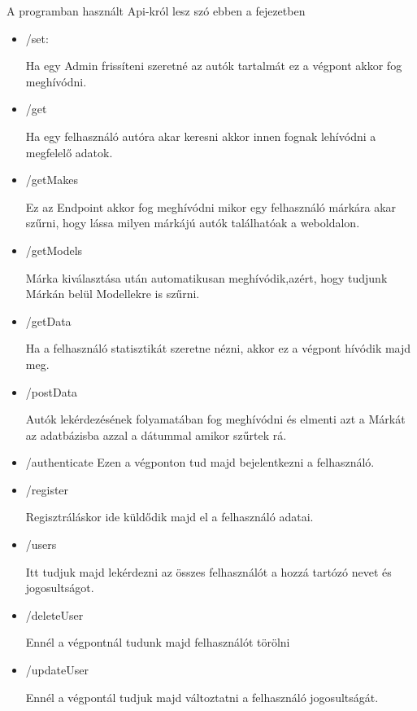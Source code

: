 A programban használt Api-król lesz szó ebben a fejezetben
\begin{itemize}
\item /set:

Ha egy Admin frissíteni szeretné az autók tartalmát ez a végpont akkor fog meghívódni.
\item /get

Ha egy felhasználó autóra akar keresni akkor innen fognak lehívódni a megfelelő adatok.
\item /getMakes

Ez az Endpoint akkor fog meghívódni mikor egy felhasználó márkára akar szűrni, hogy lássa milyen márkájú autók találhatóak a weboldalon.
\item /getModels

Márka kiválasztása után automatikusan meghívódik,azért, hogy tudjunk Márkán belül Modellekre is szűrni.

\item /getData

Ha a felhasználó statisztikát szeretne nézni, akkor ez a végpont hívódik majd meg.
\item /postData

Autók lekérdezésének folyamatában fog meghívódni és elmenti azt a Márkát az adatbázisba azzal a dátummal amikor szűrtek rá.
\item /authenticate
Ezen a végponton tud majd bejelentkezni a felhasználó.

\item /register

Regisztráláskor ide küldődik majd el a felhasználó adatai.
\item /users

Itt tudjuk majd lekérdezni az összes felhasználót a hozzá tartózó nevet és jogosultságot.
\item /deleteUser

Ennél a végpontnál tudunk majd felhasználót törölni
\item /updateUser

Ennél  a végpontál tudjuk majd változtatni a felhasználó jogosultságát.

\end{itemize}









